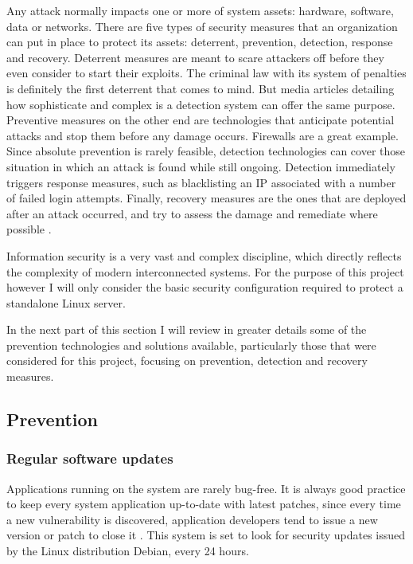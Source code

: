 Any attack normally impacts one or more of system assets: hardware, software,
data or networks. There are five types of security
measures that an organization can put in place to protect its assets:
deterrent, prevention, detection, response and recovery. Deterrent measures are
meant to scare attackers off before they even consider to start their exploits.
The criminal law with its system of penalties is definitely the first deterrent
that comes to mind. But media articles detailing how sophisticate and complex is
a detection system can offer the same purpose. Preventive measures on the other
end are technologies that anticipate potential attacks and stop them before any
damage occurs. Firewalls are a great example. Since absolute prevention
is rarely feasible, detection technologies can cover those situation in
which an attack is found while still ongoing. Detection immediately
triggers response measures, such as blacklisting an IP associated with a
number of failed login attempts. Finally, recovery measures are the ones that
are deployed after an attack occurred, and try to assess the damage and
remediate where possible \cite{BL04}.

Information security is a very vast and complex discipline, which
directly reflects the complexity of modern interconnected systems. For the
purpose of this project however I will only consider the basic security
configuration required to protect a standalone Linux server.

In the next part of this section I will review in greater details some of the
prevention technologies and solutions available, particularly those that were
considered for this project, focusing on prevention, detection and
recovery measures.

\subsection{Prevention}

\subsubsection{Regular software updates}
Applications running on the system are rarely bug-free. It is always good
practice to keep every system application up-to-date with latest patches, since
every time a new vulnerability is discovered, application developers tend
to issue a new version or patch to close it \cite{WS15}. This system is set to
look for security updates issued by the Linux distribution Debian, every 24
hours.

